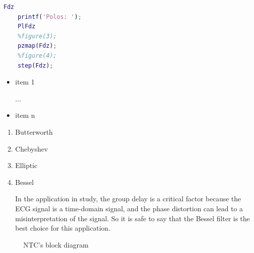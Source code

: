 \begin{lstlisting}[language=Matlab, caption=Matlab code example]
    Fdz
    printf('Polos: ');
    PlFdz
    %figure(3);
    pzmap(Fdz);
    %figure(4);
    step(Fdz);
\end{lstlisting}

\begin{itemize}
    \item item 1
    
    ...
    \item item n 
\end{itemize}

\begin{enumerate}
    \item Butterworth

    \item Chebyshev
    
    \item Elliptic
    
    \item Bessel
    
    In the application in study, the group delay is a critical factor because the ECG signal is a time-domain signal, and the phase distortion can lead to a misinterpretation of the signal. So it is safe to say that the Bessel filter is the best choice for this application.
\end{enumerate}

\begin{figure}[H]   
\begin{centering}
    
    \caption{ NTC's block diagram }
    \label{fig:NTCBlock}

\end{centering}
\end{figure}


